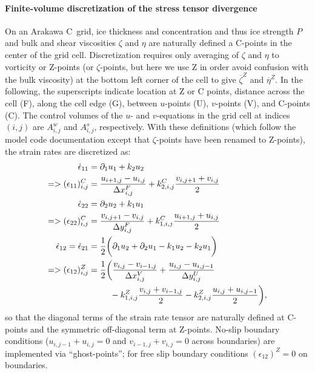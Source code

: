 \paragraph{Finite-volume discretization of the stress tensor
  divergence\label{sec:pkg:seaice:discretization}}
On an Arakawa C~grid, ice thickness and concentration and thus ice
strength $P$ and bulk and shear viscosities $\zeta$ and $\eta$ are
naturally defined a C-points in the center of the grid
cell. Discretization requires only averaging of $\zeta$ and $\eta$ to
vorticity or Z-points (or $\zeta$-points, but here we use Z in order
avoid confusion with the bulk viscosity) at the bottom left corner of
the cell to give $\overline{\zeta}^{Z}$ and $\overline{\eta}^{Z}$. In
the following, the superscripts indicate location at Z or C points,
distance across the cell (F), along the cell edge (G), between
$u$-points (U), $v$-points (V), and C-points (C). The control volumes
of the $u$- and $v$-equations in the grid cell at indices $(i,j)$ are
$A_{i,j}^{w}$ and $A_{i,j}^{s}$, respectively. With these definitions
(which follow the model code documentation except that $\zeta$-points
have been renamed to Z-points), the strain rates are discretized as:
\begin{align}
  \dot{\epsilon}_{11} &= \partial_{1}{u}_{1} + k_{2}u_{2} \\ \notag
  => (\epsilon_{11})_{i,j}^C &= \frac{u_{i+1,j}-u_{i,j}}{\Delta{x}_{i,j}^{F}} 
   + k_{2,i,j}^{C}\frac{v_{i,j+1}+v_{i,j}}{2} \\ 
  \dot{\epsilon}_{22} &= \partial_{2}{u}_{2} + k_{1}u_{1} \\\notag
  => (\epsilon_{22})_{i,j}^C &= \frac{v_{i,j+1}-v_{i,j}}{\Delta{y}_{i,j}^{F}} 
   + k_{1,i,j}^{C}\frac{u_{i+1,j}+u_{i,j}}{2} \\ 
   \dot{\epsilon}_{12} = \dot{\epsilon}_{21} &= \frac{1}{2}\biggl(
   \partial_{1}{u}_{2} + \partial_{2}{u}_{1} - k_{1}u_{2} - k_{2}u_{1}
   \biggr) \\ \notag
  => (\epsilon_{12})_{i,j}^Z &= \frac{1}{2}
  \biggl( \frac{v_{i,j}-v_{i-1,j}}{\Delta{x}_{i,j}^V} 
   + \frac{u_{i,j}-u_{i,j-1}}{\Delta{y}_{i,j}^U} \\\notag
  &\phantom{=\frac{1}{2}\biggl(}
   - k_{1,i,j}^{Z}\frac{v_{i,j}+v_{i-1,j}}{2}
   - k_{2,i,j}^{Z}\frac{u_{i,j}+u_{i,j-1}}{2}
   \biggr),
\end{align}
so that the diagonal terms of the strain rate tensor are naturally
defined at C-points and the symmetric off-diagonal term at
Z-points. No-slip boundary conditions ($u_{i,j-1}+u_{i,j}=0$ and
$v_{i-1,j}+v_{i,j}=0$ across boundaries) are implemented via
``ghost-points''; for free slip boundary conditions
$(\epsilon_{12})^Z=0$ on boundaries.

